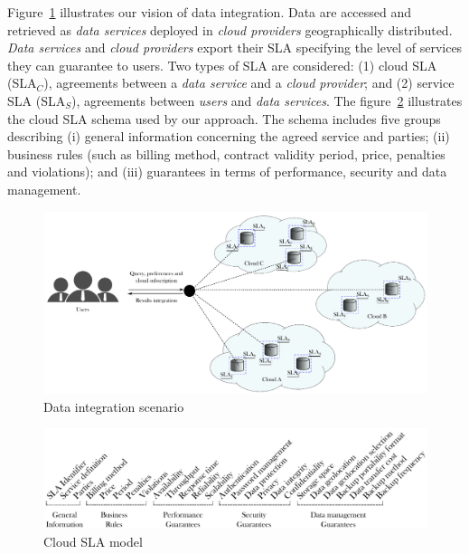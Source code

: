 
Figure~\ref{fig:scenario} illustrates our vision of data integration. Data are accessed and retrieved as \textit{data services} deployed in \textit{cloud providers} geographically distributed. \textit{Data services} and \textit{cloud providers} export their SLA specifying the level of services they can guarantee to users. Two types of SLA are considered: (1) cloud SLA (SLA$_{C}$), agreements between a \textit{data service} and a \textit{cloud provider}; and (2) service SLA (SLA$_{S}$), agreements between \textit{users} and \textit{data services}. The figure~\ref{fig:cloudsla} illustrates the cloud SLA schema used by our approach. The schema includes five groups describing (i) general information concerning the agreed service and parties; (ii) business rules (such as billing method, contract validity period, price, penalties and violations); and (iii) guarantees in terms of performance, security and data management.  

\begin{figure}[th!]
\center
\includegraphics[scale=0.40]{scenario.pdf}
\caption{Data integration scenario}\label{fig:scenario}
\end{figure}

\begin{figure}[th!]
\center
\includegraphics[scale=0.57]{Cloud_SLA.pdf}
\caption{Cloud SLA model}\label{fig:cloudsla}
\end{figure}

